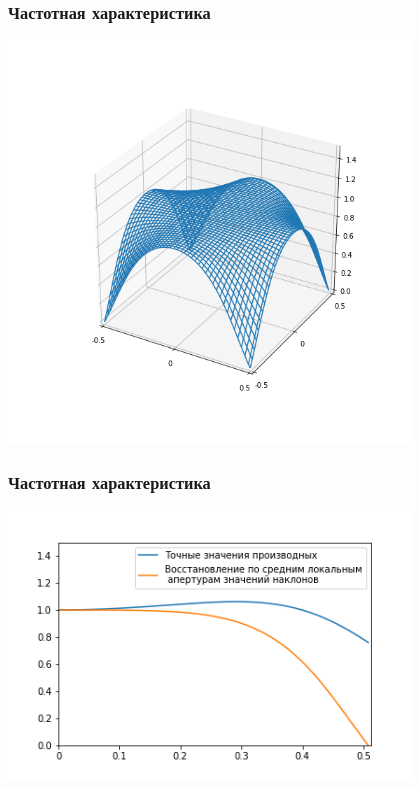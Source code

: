 \documentclass{beamer}
\begin{document}
\begin{frame}
\frametitle{Частотная характеристика}
\includegraphics[width=0.8\textwidth]{3dpiece.png}
\end{frame}

\begin{frame}
\frametitle{Частотная характеристика}
\includegraphics[width=0.8\textwidth]{2cases.png}
\end{frame}
\end{document}
